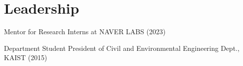 \section{Leadership}

\vspace{1mm}
\begin{pubSubsectionNum}{}
    \item Mentor for Research Interns at NAVER LABS (2023) 
    \vspace{-1mm}
    \item Department Student President of Civil and Environmental Engineering Dept., KAIST (2015) 
\end{pubSubsectionNum}
